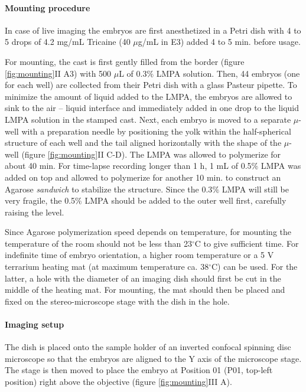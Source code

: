 \documentclass[11pt,singlespacinge,twoside]{reedthesis} %
\theoremstyle{definition}
\theoremstyle{definition}
\theoremstyle{definition}
\theoremstyle{remark}
\begin{document}
\hypertarget{mounting-procedure}{%
\paragraph{Mounting procedure}\label{mounting-procedure}}

In case of live imaging the embryos are first anesthetized in a Petri dish with 4 to 5 drops of 4.2 mg/mL Tricaine (40 \(\mu\)g/mL in E3) added 4 to 5 min. before usage.

For mounting, the cast is first gently filled from the border (figure \ref{fig:mounting}II A3) with 500 \(\mu\)L of 0.3\(\%\) LMPA solution. Then, 44 embryos (one for each well) are collected from their Petri dish with a glass Pasteur pipette. To minimize the amount of liquid added to the LMPA, the embryos are allowed to sink to the air -- liquid interface and immediately added in one drop to the liquid LMPA solution in the stamped cast. Next, each embryo is moved to a separate \(\mu\)-well with a preparation needle by positioning the yolk within the half-spherical structure of each well and the tail aligned horizontally with the shape of the \(\mu\)-well (figure \ref{fig:mounting}II C-D). The LMPA was allowed to polymerize for about 40 min. For time-lapse recording longer than 1 h, 1 mL of 0.5\(\%\) LMPA was added on top and allowed to polymerize for another 10 min. to construct an Agarose \emph{sandwich} to stabilize the structure. Since the 0.3\(\%\) LMPA will still be very fragile, the 0.5\(\%\) LMPA should be added to the outer well first, carefully raising the level.

Since Agarose polymerization speed depends on temperature, for mounting the temperature of the room should not be less than 23\(^\circ\)C to give sufficient time. For indefinite time of embryo orientation, a higher room temperature or a 5 V terrarium heating mat (at maximum temperature ca. 38\(^\circ\)C) can be used. For the latter, a hole with the diameter of an imaging dish should first be cut in the middle of the heating mat. For mounting, the mat should then be placed and fixed on the stereo-microscope stage with the dish in the hole.

\hypertarget{imaging-setup}{%
\paragraph{Imaging setup}\label{imaging-setup}}

The dish is placed onto the sample holder of an inverted confocal spinning disc microscope so that the embryos are aligned to the Y axis of the microscope stage. The stage is then moved to place the embryo at Position 01 (P01, top-left position) right above the objective (figure \ref{fig:mounting}III A).
\end{document}
